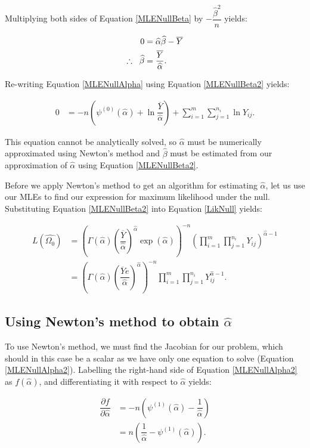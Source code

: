 \documentclass[12pt,a4paper]{article}
\newcommand{\eqn}[1]{Equation \ref{#1}}
\newcommand{\ovY}{\overline{Y}}
\newcommand{\wal}{\widehat{\alpha}}
\newcommand{\wbe}{\widehat{\beta}}
\begin{document}
	Multiplying both sides of \eqn{MLENullBeta} by $-\dfrac{\wbe^2}{n}$ yields:
	
	\begin{align}
		0 &= \wal\wbe - \ovY \nonumber \\
		\therefore \hspace{0.2cm} \wbe &= \dfrac{\ovY}{\wal}. \label{MLENullBeta2}
	\end{align}

	Re-writing \eqn{MLENullAlpha} using \eqn{MLENullBeta2} yields:
	
	\begin{align}
		0 &= -n\left(\psi^{(0)}(\wal)+\ln{\dfrac{\ovY}{\wal}}\right) + \sum_{i=1}^{m} \sum_{j=1}^{n_i} \ln{Y_{ij}}.\label{MLENullAlpha2}
	\end{align}

	This equation cannot be analytically solved, so $\wal$ must be numerically approximated using Newton's method and $\wbe$ must be estimated from our approximation of $\wal$ using \eqn{MLENullBeta2}.
	
	Before we apply Newton's method to get an algorithm for estimating $\wal$, let us use our MLEs to find our expression for maximum likelihood under the null. Substituting \eqn{MLENullBeta2} into \eqn{LikNull} yields:
	
	\begin{align}
		L(\widehat{\Omega_0}) &= \left(\Gamma(\wal)\left(\dfrac{\ovY}{\wal}\right)^{\wal}\exp(\wal)\right)^{-n} \left(\prod_{i=1}^m \prod_{j=1}^{n_i} Y_{ij}\right)^{\wal-1} \nonumber\\
		&= \left(\Gamma(\wal)\left(\dfrac{\ovY e}{\wal}\right)^{\wal}\right)^{-n} \prod_{i=1}^m \prod_{j=1}^{n_i} Y_{ij}^{\wal-1}. \label{MLNull}
	\end{align}
	
	\subsection{Using Newton's method to obtain $\wal$}
	To use Newton's method, we must find the Jacobian for our problem, which should in this case be a scalar as we have only one equation to solve (\eqn{MLENullAlpha2}). Labelling the right-hand side of \eqn{MLENullAlpha2} as $f(\wal)$, and differentiating it with respect to $\wal$ yields:
	
	\begin{align*}
		\dfrac{\partial f}{\partial \wal} &= -n\left(\psi^{(1)}(\wal) - \dfrac{1}{\wal}\right) \\
		&= n\left(\dfrac{1}{\wal} - \psi^{(1)}(\wal)\right).
	\end{align*}
\end{document}
